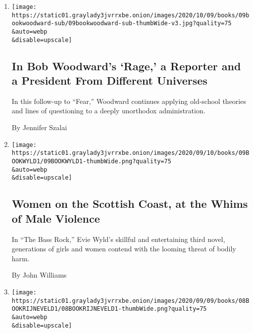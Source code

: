 \begin{enumerate}
\def\labelenumi{\arabic{enumi}.}
\item
  \href{/2020/09/09/books/review-rage-donald-trump-bob-woodward.html}{}

  \texttt{[image: https://static01.graylady3jvrrxbe.onion/images/2020/10/09/books/09bookwoodward-sub/09bookwoodward-sub-thumbWide-v3.jpg?quality=75\\\&auto=webp\\\&disable=upscale]}

  \hypertarget{in-bob-woodwards-rage-a-reporter-and-a-president-from-different-universes}{%
  \subsection{In Bob Woodward's `Rage,' a Reporter and a President From
  Different
  Universes}\label{in-bob-woodwards-rage-a-reporter-and-a-president-from-different-universes}}

  In this follow-up to ``Fear,'' Woodward continues applying old-school
  theories and lines of questioning to a deeply unorthodox
  administration.

  By Jennifer Szalai
\item
  \href{/2020/09/09/books/review-bass-rock-evie-wyld.html}{}

  \texttt{[image: https://static01.graylady3jvrrxbe.onion/images/2020/09/10/books/09BOOKWYLD1/09BOOKWYLD1-thumbWide.png?quality=75\\\&auto=webp\\\&disable=upscale]}

  \hypertarget{women-on-the-scottish-coast-at-the-whims-of-male-violence}{%
  \subsection{Women on the Scottish Coast, at the Whims of Male
  Violence}\label{women-on-the-scottish-coast-at-the-whims-of-male-violence}}

  In ``The Bass Rock,'' Evie Wyld's skillful and entertaining third
  novel, generations of girls and women contend with the looming threat
  of bodily harm.

  By John Williams
\item
  \href{/2020/09/08/books/review-discomfort-of-evening-marieke-lucas-rijneveld.html}{}

  \texttt{[image: https://static01.graylady3jvrrxbe.onion/images/2020/09/09/books/08BOOKRIJNEVELD1/08BOOKRIJNEVELD1-thumbWide.png?quality=75\\\&auto=webp\\\&disable=upscale]}

  \hypertarget{an-award-winning-debut-novel-about-innocence-shattered-offers-terror-and-solace}{%
}
\end{enumerate}
